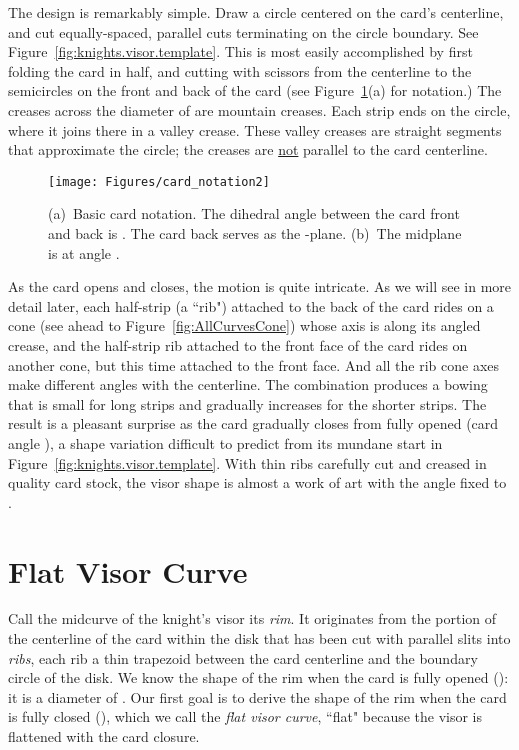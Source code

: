 \pdfoutput=1  \documentclass[]{article}
\newcommand{\figlab}[1]{\label{fig:#1}}
\newcommand{\figref}[1]{\ref{fig:#1}}
\begin{document}
The design is remarkably simple.
Draw a circle  centered on the card's centerline, and cut equally-spaced,
parallel cuts terminating on the circle boundary.
See Figure~\figref{knights.visor.template}.
This is most easily accomplished by first folding the card in half, and cutting with scissors from the centerline
to the semicircles on the front and back of the card
(see Figure~\figref{card.notation}(a) for notation.)
The creases across the diameter of  are mountain creases.
Each strip ends on the circle, where it joins there in a valley crease.
These valley creases are straight segments that approximate the circle;
the creases are \underline{not} parallel to the card centerline.

\begin{figure}[htbp]
\centering
\texttt{[image: Figures/card\_notation2]}
\caption{(a)~Basic card notation.  
The dihedral angle between the card front and back is .  The card back serves
as the -plane.
(b)~The midplane is at angle .}
\figlab{card.notation}
\end{figure}



As the card opens and closes, the motion is quite intricate.
As we will see in more detail later,
each half-strip (a ``rib") attached to the back
of the card rides on a cone (see ahead to Figure~\figref{AllCurvesCone})
whose axis is along its angled crease, 
and the half-strip rib attached to the front face of the card rides on another cone,
but this time attached to the front face.  And all the rib cone axes make different
angles with the centerline.  The combination produces a bowing that is small for long strips
and gradually increases for the shorter strips.
The result is a pleasant surprise as the card gradually closes from
fully opened (card angle ), a shape variation difficult to predict from 
its mundane start in Figure~\figref{knights.visor.template}.
With thin ribs carefully cut and creased in quality card stock, 
the visor shape is almost a work of art with the angle fixed to .


\section{Flat Visor Curve}
Call the midcurve of the knight's visor its \emph{rim}.
It originates from the portion of the centerline of the card within the disk 
that has been cut with parallel slits into \emph{ribs}, each rib  a thin
trapezoid between the card centerline and the boundary circle  of the disk.
We know the shape of the rim when the card is fully opened (): it is a diameter
of .
Our first goal is to derive the shape of the rim when the card is fully closed (), which
we call the \emph{flat visor curve}, ``flat" because the visor is flattened with the card closure.
\end{document}
